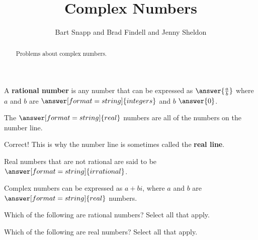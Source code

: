 \documentclass[nooutcomes]{ximera}
\title{Complex Numbers}
\author{Bart Snapp and Brad Findell and Jenny Sheldon}
\begin{document}
\begin{abstract}
Problems about complex numbers.
\end{abstract}
\maketitle



\begin{problem}
A \textbf{rational number} is any number that can be expressed as $\answer{\frac{a}{b}}$ where $a$ and $b$ are $\answer[format=string]{integers}$ and $b$ \wordChoice{\choice{$=$} \choice{$<$} \choice{$>$} \choice[correct]{$\ne$}} $\answer{0}$.
\end{problem}

\begin{problem}
The $\answer[format=string]{real}$ numbers are all of the numbers on the number line.
\begin{problem}
Correct!  This is why the number line is sometimes called the \textbf{real line}.  

Real numbers that are not rational are said to be $\answer[format=string]{irrational}$. 
\end{problem}
\end{problem}

\begin{problem}
Complex numbers can be expressed as $a+bi$, where $a$ and $b$ are $\answer[format=string]{real}$ numbers.  
\end{problem}

\begin{problem}
Which of the following are rational numbers?  Select all that apply.

\begin{selectAll}
\end{selectAll}
\end{problem}



\begin{problem}
Which of the following are real numbers?  Select all that apply.

\begin{selectAll}
\end{selectAll}
\end{problem}
\end{document}
